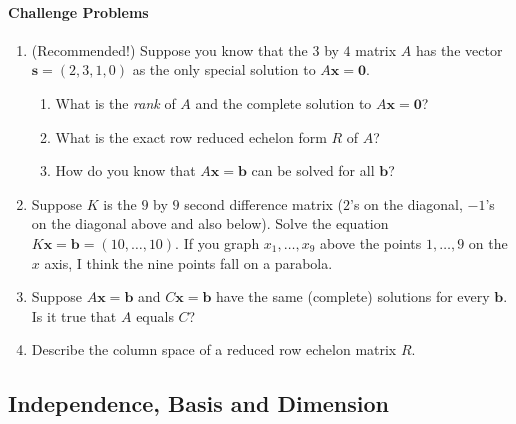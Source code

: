 \documentclass[14pt, a4paper]{article}
\begin{document}
\paragraph{Challenge Problems}
\begin{enumerate}[resume]
    \item (Recommended!) Suppose you know that the $3$ by $4$ matrix $A$ has the vector $\mathbf{s} = (2,3,1,0)$ as the only special solution to $A\mathbf{x} = \mathbf{0}$.
          \begin{enumerate}
              \item What is the \emph{rank} of $A$ and the complete solution to $A\mathbf{x} = \mathbf{0}$?
              \item What is the exact row reduced echelon form $R$ of $A$?
              \item How do you know that $A\mathbf{x} = \mathbf{b}$ can be solved for all $\mathbf{b}$?
          \end{enumerate}

    \item Suppose $K$ is the $9$ by $9$ second difference matrix ($2$'s on the diagonal, $-1$'s on the diagonal above and also below). Solve the equation $K\mathbf{x} = \mathbf{b} = (10,\dots,10)$. If you graph $x_1,\dots,x_9$ above the points $1,\dots,9$ on the $x$ axis, I think the nine points fall on a parabola.

    \item Suppose $A\mathbf{x} = \mathbf{b}$ and $C\mathbf{x} = \mathbf{b}$ have the same (complete) solutions for every $\mathbf{b}$. Is it true that $A$ equals $C$?

    \item Describe the column space of a reduced row echelon matrix $R$.
\end{enumerate}

\subsection{Independence, Basis and Dimension}
\end{document}

